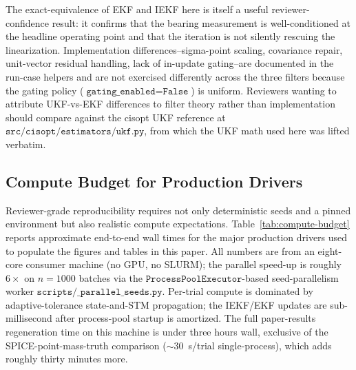 \documentclass[10pt,twocolumn]{article}
\begin{document}
The exact-equivalence of EKF and IEKF here is itself a useful reviewer-confidence result: it confirms that the bearing measurement is well-conditioned at the headline operating point and that the iteration is not silently rescuing the linearization.  Implementation differences--sigma-point scaling, covariance repair, unit-vector residual handling, lack of in-update gating--are documented in the run-case helpers and are not exercised differently across the three filters because the gating policy ($\texttt{gating\_enabled}=\texttt{False}$) is uniform.  Reviewers wanting to attribute UKF-vs-EKF differences to filter theory rather than implementation should compare against the cisopt UKF reference at $\texttt{src/cisopt/estimators/ukf.py}$, from which the UKF math used here was lifted verbatim.

\subsection{Compute Budget for Production Drivers}
\label{sec:compute-budget}
Reviewer-grade reproducibility requires not only deterministic seeds and a pinned environment but also realistic compute expectations.  Table~\ref{tab:compute-budget} reports approximate end-to-end wall times for the major production drivers used to populate the figures and tables in this paper.  All numbers are from an eight-core consumer machine (no GPU, no SLURM); the parallel speed-up is roughly $6\times$ on $n=1000$ batches via the $\texttt{ProcessPoolExecutor}$-based seed-parallelism worker $\texttt{scripts/\_parallel\_seeds.py}$.  Per-trial compute is dominated by adaptive-tolerance state-and-STM propagation; the IEKF/EKF updates are sub-millisecond after process-pool startup is amortized.  The full paper-results regeneration time on this machine is under three hours wall, exclusive of the SPICE-point-mass-truth comparison ($\sim 30$~s/trial single-process), which adds roughly thirty minutes more.
\end{document}
